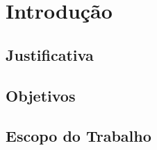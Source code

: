 
\chapter{Introdução}
\label{ch:intro}

\lipsum[1]

\section{Justificativa}


\section{Objetivos}


\section{Escopo do Trabalho}